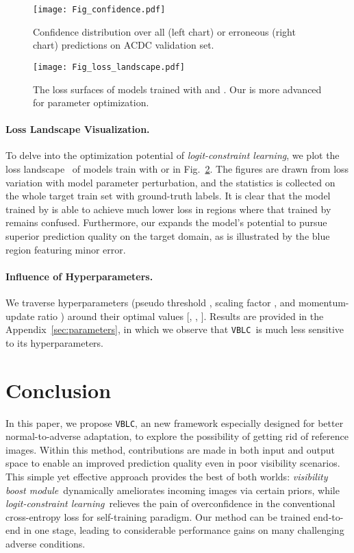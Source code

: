 \documentclass[letterpaper]{article} \usepackage{aaai23}  \usepackage{times}  \usepackage{helvet}  \usepackage{courier}  \usepackage[hyphens]{url}  \usepackage{graphicx} \urlstyle{rm} \def\UrlFont{\rm}  \usepackage{natbib}  \usepackage{caption} \frenchspacing  \setlength{\pdfpagewidth}{8.5in}  \setlength{\pdfpageheight}{11in}  \usepackage{algorithm}
\newcommand{\method}{\texttt{VBLC}~}
\newcommand{\methodblank}{\texttt{VBLC}}
\newcommand{\boostModuleName}{\textit{visibility boost module}}
\newcommand{\lossModuleName}{\textit{logit-constraint learning}}
\begin{document}
\begin{figure}[t]
    \centering
    \texttt{[image: Fig\_confidence.pdf]}
    \caption{Confidence distribution over all (left chart) or erroneous (right chart) predictions on ACDC validation set.}
    \label{fig:conf}
\end{figure}

\begin{figure}[t]
    \centering
    \texttt{[image: Fig\_loss\_landscape.pdf]}
    \caption{The loss surfaces of models trained with  and . Our  is more advanced for parameter optimization.}
    \label{fig:landscape}
\end{figure}

\paragraph{Loss Landscape Visualization.} To delve into the optimization potential of \lossModuleName, we plot the loss landscape~\cite{li2018visualizing} of models train with  or  in Fig.~\ref{fig:landscape}. The figures are drawn from loss variation with model parameter perturbation, and the statistics is collected on the whole target train set with ground-truth labels. It is clear that the model trained by  is able to achieve much lower loss in regions where that trained by  remains confused. Furthermore, our  expands the model's potential to pursue superior prediction quality on the target domain, as is illustrated by the blue region featuring minor error.

\paragraph{Influence of Hyperparameters.} We traverse hyperparameters (pseudo threshold , scaling factor , and momentum-update ratio ) around their optimal values [, , ]. Results are provided in the Appendix~\ref{sec:parameters}, in which we observe that \method is much less sensitive to its hyperparameters.

\section{Conclusion}

In this paper, we propose \methodblank, an new framework especially designed for better normal-to-adverse adaptation, to explore the possibility of getting rid of reference images. Within this method, contributions are made in both input and output space to enable an improved prediction quality even in poor visibility scenarios. This simple yet effective approach provides the best of both worlds: \boostModuleName~dynamically ameliorates incoming images via certain priors, while \lossModuleName~relieves the pain of overconfidence in the conventional cross-entropy loss for self-training paradigm. Our method can be trained end-to-end in one stage, leading to considerable performance gains on many challenging adverse conditions.
\end{document}
